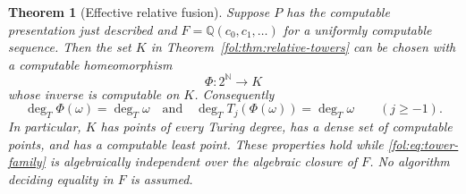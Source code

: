 \documentclass[11pt,a4paper]{article}
\newtheorem{theorem}{Theorem}[section]
\theoremstyle{definition}
\theoremstyle{remark}
\numberwithin{equation}{section}
\begin{document}
\begin{theorem}[Effective relative fusion]\label{fol:thm:effective-towers}
Suppose $P$ has the computable presentation just described and
$F=\mathbb Q(c_0,c_1,\ldots)$ for a uniformly computable sequence.
Then the set $K$ in Theorem~\ref{fol:thm:relative-towers} can be chosen with a
computable homeomorphism
\[
 \Phi:2^{\mathbb N}\longrightarrow K
\]
whose inverse is computable on $K$. Consequently
\[
 \deg_T\Phi(\omega)=\deg_T\omega
 \quad\text{and}\quad
 \deg_T T_j(\Phi(\omega))=\deg_T\omega
 \qquad(j\ge-1).
\]
In particular, $K$ has points of every Turing degree, has a dense set of
computable points, and has a computable least point. These properties
hold while \eqref{fol:eq:tower-family} is algebraically independent over the
algebraic closure of $F$. No algorithm deciding equality in $F$ is
assumed.
\end{theorem}
\end{document}
